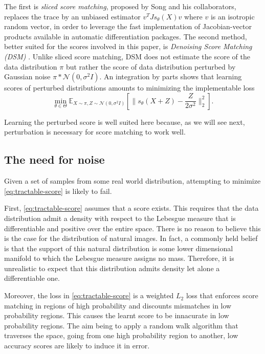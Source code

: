 \documentclass[10pt,journal,a4paper]{IEEEtran}
\theoremstyle{definition}
\newcommand{\E}{\mathbb{E}}
\begin{document}
The first is \textit{sliced score matching}, proposed by Song and his collaborators, replaces the trace by an unbiased estimator $v^TJ{s_\theta}(X)v$ where $v$ is an isotropic random vector, in order to leverage the fast implementation of Jacobian-vector products available in automatic differentiation packages. The second method, better suited for the scores involved in this paper, is \textit{Denoising Score Matching (DSM)} \cite{vincent_connection_2011}. Unlike sliced score matching, DSM does not estimate the score of the data distribution $\pi$ but rather the score of data distribution perturbed by Gaussian noise $\pi * \mathcal{N}(0, \sigma^2I)$. An integration by parts shows that learning scores of perturbed distributions amounts to minimizing the implementable loss
\[
\min_{\theta \in \Theta} \E_{X \sim \pi, Z \sim \mathcal{N}(0, \sigma^2I)} \left[ \|s_\theta(X + Z) -  \frac{Z}{2\sigma^2}\|_2^2\right].
\]

Learning the perturbed score is well suited here because, as we will see next, perturbation is necessary for score matching to work well.

\subsection{The need for noise}
\label{sec:noise}

Given a set of samples from some real world distribution, attempting to minimize \eqref{eq:tractable-score} is likely to fail.

First, \eqref{eq:tractable-score} assumes that a score exists. This requires that the data distribution admit a density with respect to the Lebesgue measure that is differentiable and positive over the entire space. There is no reason to believe this is the case for the distribution of natural images. In fact, a commonly held belief is that the support of this natural distribution is some lower dimensional manifold to which the Lebesgue measure assigns no mass. Therefore, it is unrealistic to expect that this distribution admits density let alone a differentiable one.

Moreover, the loss in \eqref{eq:tractable-score} is a weighted $L_2$ loss that enforces score matching in regions of high probability and discounts mismatches in low probability regions. This causes the learnt score to be innacurate in low probability regions. The aim being to apply a random walk algorithm that traverses the space, going from one high probability region to another, low accuracy scores are likely to induce it in error. 
\end{document}
